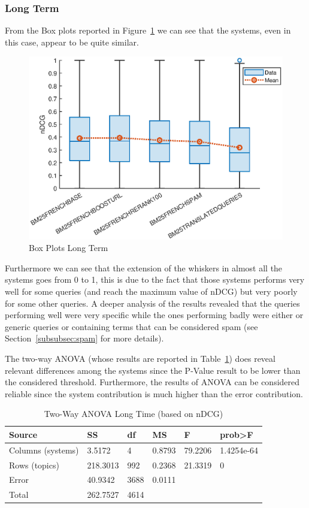 \subsubsection{Long Term}
\label{subsubsec:lt}
From the Box plots reported in Figure~\ref{fig:LTBP} we can see that the systems, even in this case, appear to be quite similar.
\begin{figure}[tb]
    \centering
    \includegraphics[scale=0.8]{figure/longterm/boxplot.eps}
    \caption{Box Plots Long Term}
    \label{fig:LTBP}
\end{figure}
Furthermore we can see that the extension of the whiskers in almost all the systems goes from 0 to 1, this is due to the fact that those systems performs very well for some queries (and reach the maximum value of nDCG) but very poorly for some other queries. A deeper analysis of the results revealed that the queries performing well were very specific while the ones performing badly were either or generic queries or containing terms that can be considered spam (see Section~\ref{subsubsec:spam} for more details).
\par
The two-way \ac{ANOVA} (whose results are reported in Table~\ref{tab:LTANOVA}) does reveal relevant differences among the systems since the P-Value result to be lower than the considered threshold. Furthermore, the results of \ac{ANOVA} can be considered reliable since the system contribution is much higher than the error contribution.
\begin{table}[tb]
  \caption{Two-Way ANOVA Long Time (based on nDCG)}
  \label{tab:LTANOVA}
  \centering
  \begin{tabular}{|l|l|l|l|l|l|}
    \toprule
    Source & SS & df & MS & F & prob>F\\
    \midrule
    Columns (systems) & 3.5172 & 4 & 0.8793 & 79.2206 & 1.4254e-64\\
    Rows (topics) & 218.3013 & 992 & 0.2368 & 21.3319 & 0\\
    Error & 40.9342 & 3688 & 0.0111 &  & \\
    Total & 262.7527 & 4614 &  &  & \\
  \bottomrule
\end{tabular}
\end{table}
